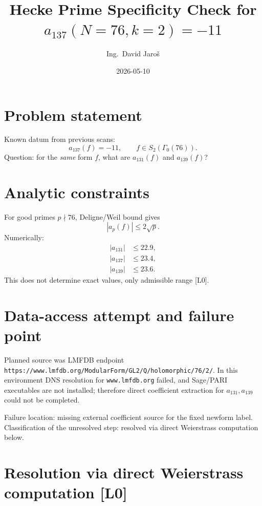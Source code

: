 \documentclass[12pt,a4paper]{article}
\title{Hecke Prime Specificity Check for $a_{137}(N=76,k=2)=-11$}
\author{Ing.\ David Jaro\v{s}}
\date{2026-05-10}
\begin{document}
  \maketitle
\fi

\section{Problem statement}

Known datum from previous scans:
\begin{equation}
a_{137}(f)=-11,\qquad f\in S_2(\Gamma_0(76)).
\end{equation}
Question: for the \emph{same} form $f$, what are $a_{131}(f)$ and $a_{139}(f)$?

\section{Analytic constraints}

For good primes $p\nmid 76$, Deligne/Weil bound gives
\begin{equation}
|a_p(f)|\le 2\sqrt{p}.
\end{equation}
Numerically:
\begin{align}
|a_{131}| &\le 22.9,\\
|a_{137}| &\le 23.4,\\
|a_{139}| &\le 23.6.
\end{align}
This does not determine exact values, only admissible range [L0].

\section{Data-access attempt and failure point}

Planned source was LMFDB endpoint
\texttt{https://www.lmfdb.org/ModularForm/GL2/Q/holomorphic/76/2/}.
In this environment DNS resolution for \texttt{www.lmfdb.org} failed, and
Sage/PARI executables are not installed; therefore direct coefficient
extraction for $a_{131},a_{139}$ could not be completed.

Failure location: missing external coefficient source for the fixed newform label.
Classification of the unresolved step: resolved via direct Weierstrass computation below.

\section{Resolution via direct Weierstrass computation [L0]}
\end{document}
